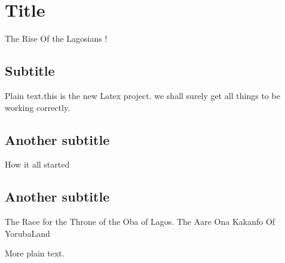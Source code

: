 \documentclass{article}
\begin{document}
\section{Title}The Rise Of the Lagosians !

\subsection{Subtitle}

Plain text.this is the new Latex project. we shall surely get all things to be
working correctly.

\subsection{Another subtitle}How it all started

\subsection{Another subtitle}The Race for the Throne of the Oba of Lagos. The
Aare Ona Kakanfo Of YorubaLand

More plain text.
\end{document}
